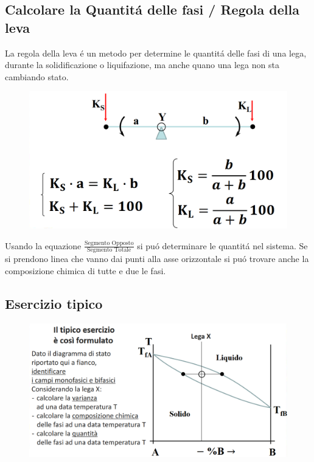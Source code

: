 \documentclass{article}
\begin{document}
{        \subsection{Calcolare la Quantit\'a delle fasi / Regola della leva}
            La regola della leva \'e un metodo per determine le quantit\'a delle fasi di una lega, durante la solidificazione o liquifazione, ma anche quano una lega non sta cambiando stato.
            \newpage
            \begin{figure}[!h]
                \centering
                \includegraphics[width=.85\linewidth]{Spiegazione della regola della leva per un sistema con metalli con puri.png}
            \end{figure}
            Usando la equazione $\frac{\text{Segmento Opposto}}{\text{Segmento Totale}}$ si pu\'o determinare le quantit\'a nel sistema. Se si prendono linea che vanno dai punti alla asse orizzontale si pu\'o trovare anche la composizione chimica di tutte e due le fasi.
        \subsection{Esercizio tipico}
            \begin{figure}[!h]
                \centering
                \includegraphics[width=.85\linewidth]{Esempi di esercizi nei diagramma di stato binario.png}
            \end{figure}
        \newpage
}
\end{document}
